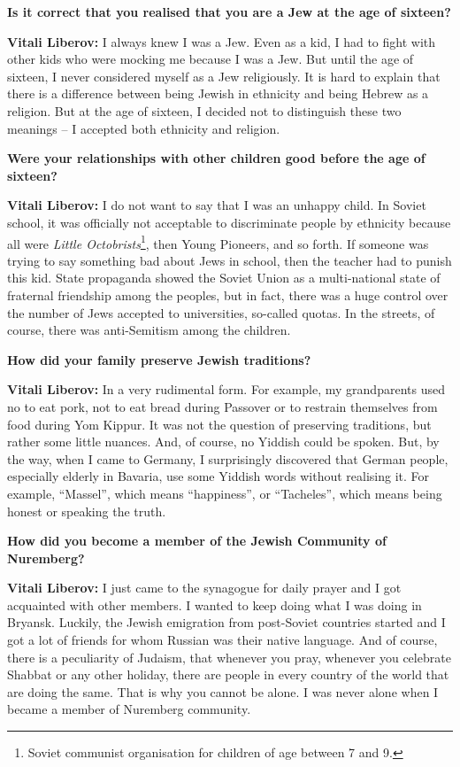 \textbf{Is it correct that you realised that you are a Jew at the age of sixteen?} 

\textbf{Vitali Liberov:} I always knew I was a Jew. Even as a kid, I had to fight with other kids who were mocking me because I was a Jew. But until the age of sixteen, I never considered myself as a Jew religiously. It is hard to explain that there is a difference between being Jewish in ethnicity and being Hebrew as a religion. But at the age of sixteen, I decided not to distinguish these two meanings – I accepted both ethnicity and religion.  

\textbf{Were your relationships with other children good before the age of sixteen?} 

\textbf{Vitali Liberov:} I do not want to say that I was an unhappy child. In Soviet school, it was officially not acceptable to discriminate people by ethnicity because all were \textit{Little Octobrists}\footnote{Soviet communist organisation for children of age between 7 and 9.}, then Young Pioneers, and so forth. If someone was trying to say something bad about Jews in school, then the teacher had to punish this kid. State propaganda showed the Soviet Union as a multi-national state of fraternal friendship among the peoples, but in fact, there was a huge control over the number of Jews accepted to universities, so-called quotas. In the streets, of course, there was anti-Semitism among the children.  

\textbf{How did your family preserve Jewish traditions?} 

\textbf{Vitali Liberov:} In a very rudimental form. For example, my grandparents used no to eat pork, not to eat bread during Passover or to restrain themselves from food during Yom Kippur. It was not the question of preserving traditions, but rather some little nuances. And, of course, no Yiddish could be spoken. But, by the way, when I came to Germany, I surprisingly discovered that German people, especially elderly in Bavaria, use some Yiddish words without realising it. For example, ``Massel'', which means ``happiness'', or ``Tacheles'', which means being honest or speaking the truth.  

\textbf{How did you become a member of the Jewish Community of Nuremberg?} 

\textbf{Vitali Liberov:} I just came to the synagogue for daily prayer and I got acquainted with other members. I wanted to keep doing what I was doing in Bryansk. Luckily, the Jewish emigration from post-Soviet countries started and I got a lot of friends for whom Russian was their native language. And of course, there is a peculiarity of Judaism, that whenever you pray, whenever you celebrate Shabbat or any other holiday, there are people in every country of the world that are doing the same. That is why you cannot be alone. I was never alone when I became a member of Nuremberg community.  

